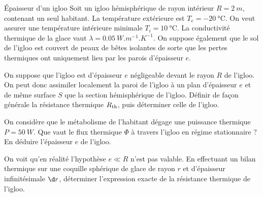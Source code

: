\begin{exo}[PC][2][TD]{Épaisseur d'un igloo}
Soit un igloo hémisphérique de rayon intérieur $R=\SI{2}{m}$, contenant un seul habitant. La température extérieure est $T_e = \SI{-20}{\celsius}$.
On veut assurer une température intérieure minimale $T_i=\SI{10}{\celsius}$. La conductivité thermique de la glace vaut $\lambda=\SI{0,05}{W.m^{-1}.K^{-1}}$.
On suppose également que le sol de l'igloo est couvert de peaux de bêtes isolantes de sorte que les pertes thermiques ont uniquement lieu par les parois d'épaisseur $e$.

\begin{quest}
\item\label{quest:1} On suppose que l'igloo est d'épaisseur $e$ négligeable devant le rayon $R$ de l'igloo. On peut donc assimiler localement la paroi de l'igloo à un plan d'épaisseur $e$ et de même surface $S$ que la section hémisphérique de l'igloo.
Définir de façon générale la résistance thermique $R_{\rm th}$, puis déterminer celle de l'igloo.
\item On considère que le métabolisme de l'habitant dégage une puissance thermique $P=\SI{50}{W}$.
Que vaut le flux thermique $\Phi$ à travers l'igloo en régime stationnaire ? En déduire l'épaisseur $e$ de l'igloo.
\item On voit qu'en réalité l'hypothèse $e \ll R$ n'est pas valable.
En effectuant un bilan thermique sur une coquille sphérique de glace de rayon $r$ et d'épaisseur infinitésimale $\d r$, déterminer l'expression exacte de la résistance thermique de l'igloo.
\end{quest}
\end{exo}
